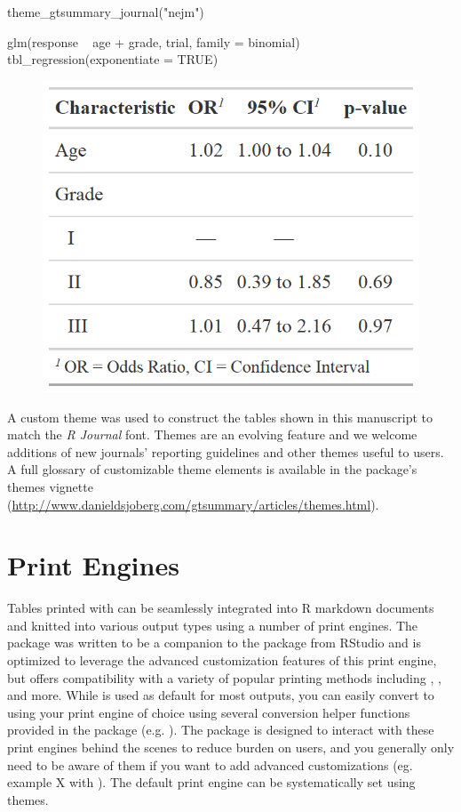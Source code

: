 \newpage
\begin{example}
theme_gtsummary_journal("nejm")

glm(response ~ age + grade, trial, family = binomial) %
  tbl_regression(exponentiate = TRUE)
\end{example}

\begin{figure}[h!]
  \includegraphics[scale=0.35]{nejm.png}
  \centering
\end{figure}

A custom theme was used to construct the  tables shown in this manuscript to match the \emph{R Journal} font. 
Themes are an evolving feature and we welcome additions of new journals' reporting guidelines and other themes useful to users.
A full glossary of customizable theme elements is available in the package's themes vignette (\url{http://www.danieldsjoberg.com/gtsummary/articles/themes.html}).

\section{Print Engines}

Tables printed with  can be seamlessly integrated into R markdown documents and knitted into various output types using a number of print engines.
The package was written to be a companion to the  package from RStudio and is optimized to leverage the advanced customization features of this print engine, but offers compatibility with a variety of popular printing methods including , ,  and more.
While  is used as default for most outputs, you can easily convert to using your print engine of choice using several conversion helper functions provided in the package (e.g. ).
The package is designed to interact with these print engines behind the scenes to reduce burden on users, and you generally only need to be aware of them if you want to add advanced customizations (eg. example X with ). The default print engine can be systematically set using  themes.


